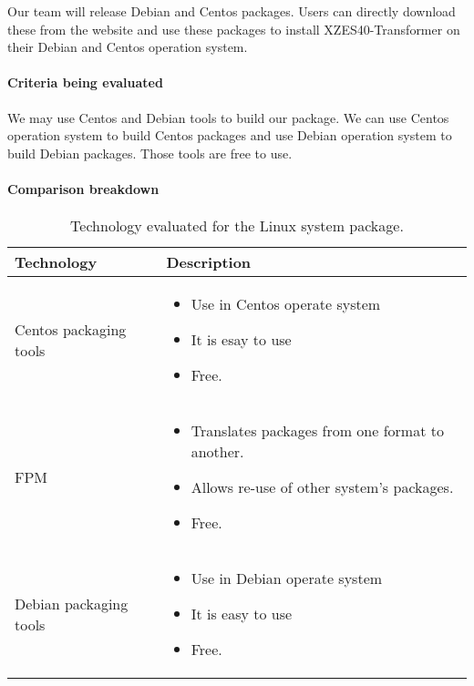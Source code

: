 Our team will release Debian and Centos packages.
Users can directly download these from the website and use these packages to install XZES40-Transformer on their Debian and Centos operation system.

\paragraph{Criteria being evaluated}

We may use Centos and Debian tools to build our package.
We can use Centos operation system to build Centos packages and use Debian operation system to build Debian packages.
Those tools are free to use.

\paragraph{Comparison breakdown}

\begin{table}[H]
  \begin{center}
    \begin{tabular}{ | l | p{10cm} |}
      \hline
      Technology & Description  \\ \hline

      Centos packaging tools \cite{centos-tool} &
      \begin{itemize}
        \item Use in Centos operate system 
        \item It is esay to use
        \item Free.
      \end{itemize} \\ \hline

      FPM \cite{fpm-home} &
      \begin{itemize}
        \item Translates packages from one format to another.
        \item Allows re-use of other system's packages.
        \item Free.
      \end{itemize} \\ \hline

      Debian packaging tools \cite{debian-tool} &
      \begin{itemize}
        \item Use in Debian operate system
        \item It is easy to use
        \item Free.
      \end{itemize} \\ \hline
    \end{tabular}
  \end{center}
  \caption{Technology evaluated for the Linux system package.}
\end{table}

